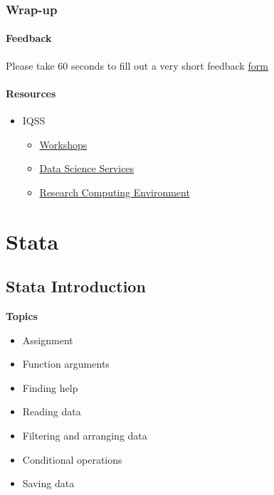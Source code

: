 \documentclass[]{book}
\providecommand{\tightlist}{%
  \setlength{\itemsep}{0pt}\setlength{\parskip}{0pt}}
\begin{document}
\section{Wrap-up}\label{wrap-up-5}

\subsection{Feedback}\label{feedback-5}

Please take 60 seconds to fill out a very short feedback
\href{http://bit.ly/training_class_eval}{form}

\subsection{Resources}\label{resources-5}

\begin{itemize}
\tightlist
\item
  IQSS

  \begin{itemize}
  \tightlist
  \item
    \href{https://dss.iq.harvard.edu/workshop-materials}{Workshops}
  \item
    \href{https://dss.iq.harvard.edu/}{Data Science Services}
  \item
    \href{https://iqss.github.io/dss-rce/}{Research Computing
    Environment}
  \end{itemize}
\end{itemize}

\part{Stata}\label{part-stata}

\chapter{Stata Introduction}\label{stata-introduction}

\textbf{Topics}

\begin{itemize}
\tightlist
\item
  Assignment
\item
  Function arguments
\item
  Finding help
\item
  Reading data
\item
  Filtering and arranging data
\item
  Conditional operations
\item
  Saving data
\end{itemize}
\end{document}
